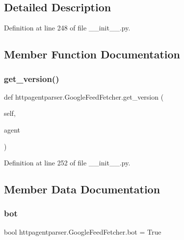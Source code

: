 \subsection{Detailed Description}


Definition at line 248 of file \+\_\+\+\_\+init\+\_\+\+\_\+.\+py.



\subsection{Member Function Documentation}
\hypertarget{classhttpagentparser_1_1_google_feed_fetcher_a05382fd53cfd87284a0159ea45279c76}{}\label{classhttpagentparser_1_1_google_feed_fetcher_a05382fd53cfd87284a0159ea45279c76} 
\subsubsection{\texorpdfstring{get\+\_\+version()}{get\_version()}}
{\footnotesize\ttfamily def httpagentparser.\+Google\+Feed\+Fetcher.\+get\+\_\+version (\begin{DoxyParamCaption}\item[{}]{self,  }\item[{}]{agent }\end{DoxyParamCaption})}



Definition at line 252 of file \+\_\+\+\_\+init\+\_\+\+\_\+.\+py.



\subsection{Member Data Documentation}
\hypertarget{classhttpagentparser_1_1_google_feed_fetcher_a488c5225365034fcece778fd4b50fb7b}{}\label{classhttpagentparser_1_1_google_feed_fetcher_a488c5225365034fcece778fd4b50fb7b} 
\subsubsection{\texorpdfstring{bot}{bot}}
{\footnotesize\ttfamily bool httpagentparser.\+Google\+Feed\+Fetcher.\+bot = True\hspace{0.3cm}{\ttfamily [static]}}



